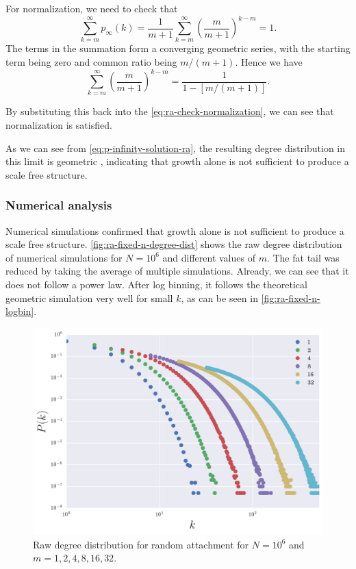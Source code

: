 For normalization, we need to check that 
\begin{equation}
	\sum_{k=m}^{\infty}p_{\infty}(k) = \frac{1}{m+1} \sum_{k=m}^{\infty} \left ( \frac{m}{m+1}\right )^{k-m} = 1.
	\label{eq:ra-check-normalization}
\end{equation}
The terms in the summation form a converging geometric series, with the starting term being zero and common ratio being $m / (m+1)$. Hence we have 
\begin{equation}
	\sum_{k=m}^{\infty} \left ( \frac{m}{m+1} \right )^{k-m} = \frac{1}{1 - [m / (m+1)]}. 
	\label{eq:ra-geom-series}
\end{equation}

By substituting this back into the \autoref{eq:ra-check-normalization}, we can see that normalization is satisfied. 

As we can see from \autoref{eq:p-infinity-solution-ra}, the resulting degree distribution in this limit is geometric \citep{Pekoz2013}, indicating that growth alone is not sufficient to produce a scale free structure. 

\subsubsection{Numerical analysis}\label{subsection:ra-numerical-analysis}
Numerical simulations confirmed that growth alone is not sufficient to produce a scale free structure. \autoref{fig:ra-fixed-n-degree-dist} shows the raw degree distribution of numerical simulations for $N=10^6$ and different values of $m$. The fat tail was reduced by taking the average of multiple simulations. Already, we can see that it does not follow a power law. After log binning, it follows the theoretical geometric simulation very well for small $k$, as can be seen in \autoref{fig:ra-fixed-n-logbin}.

\begin{figure}
    \centering
    \includegraphics[height=0.5\linewidth]{img/ra-fixed-n-degree-dist}
    \caption{Raw degree distribution for random attachment for $N = 10^6$ and $m = 1, 2, 4, 8, 16, 32$. }
    \label{fig:ra-fixed-n-degree-dist}
\end{figure}

